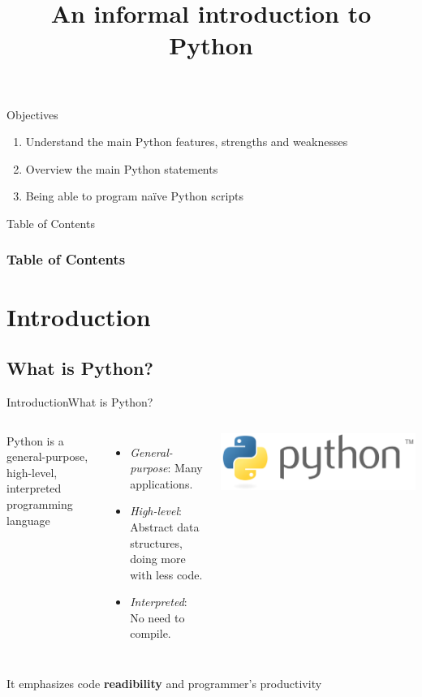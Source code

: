 \documentclass[10pt,compress]{beamer} %
\title[An informal introduction to Python]{An informal introduction to Python}
\author{}
\institute{\asignatura}
\date{}
\begin{document}
{\titlepageBlue
    \begin{frame}
        \titlepage
    \end{frame}
}

\begin{frame}[plain]{}
	\begin{block}{Objectives}
		\begin{enumerate}
		\item Understand the main Python features, strengths and weaknesses
		\item Overview the main Python statements
		\item Being able to program na\"ive Python scripts
		\end{enumerate}
	\end{block}
\end{frame}

{
\begin{frame}[shrink]{Table of Contents}
 \frametitle{Table of Contents}
 \tableofcontents
\end{frame}
}

\section{Introduction}
\subsection{What is Python?}

\begin{frame}{Introduction}{What is Python?}
    \begin{columns}
			Python is a general-purpose, high-level, interpreted programming language
				\begin{itemize}
				\item \textit{General-purpose}: Many applications.
				\item \textit{High-level}: Abstract data structures, doing more with less code.
				\item \textit{Interpreted}: No need to compile.
				\end{itemize}

		\centering \hspace{-2cm} \includegraphics[width=1.8\linewidth]{figs/python.png}
	\end{columns}
	\bigskip
			It emphasizes code \textbf{readibility} and programmer's productivity\\
\end{frame}
\end{document}
